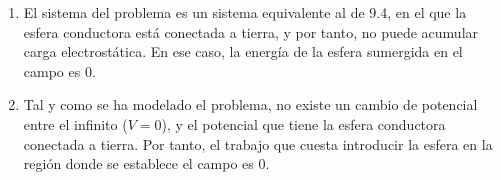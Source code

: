 \begin{enumerate}
    \vspace{20px}

    \item El sistema del problema es un sistema equivalente al de 9.4, en el que la esfera conductora está conectada a tierra, y por tanto, no puede acumular carga electrostática.
    En ese caso, la energía de la esfera sumergida en el campo es 0.

    \vspace{20px}

    \item Tal y como se ha modelado el problema, no existe un cambio de potencial entre el infinito ($V = 0$), y el potencial que tiene la esfera conductora
    conectada a tierra. Por tanto, el trabajo que cuesta introducir la esfera en la región donde se establece el campo es 0.

\end{enumerate}